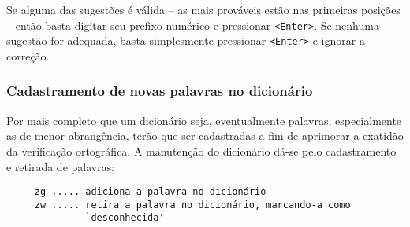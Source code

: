 Se alguma das sugestões é válida -- as mais prováveis estão nas primeiras
posições -- então basta digitar seu prefixo numérico e pressionar 
\texttt{<Enter>}. Se nenhuma sugestão for adequada, basta simplesmente
pressionar \texttt{<Enter>} e ignorar a correção.

\subsubsection{Cadastramento de novas palavras no dicionário}

Por mais completo que um dicionário seja, eventualmente palavras,
especialmente as de menor abrangência, terão que ser cadastradas a fim de
aprimorar a exatidão da verificação ortográfica. A manutenção do dicionário 
dá-se pelo cadastramento e retirada de palavras:

\begin{verbatim}
     zg ..... adiciona a palavra no dicionário
     zw ..... retira a palavra no dicionário, marcando-a como 
              `desconhecida'
\end{verbatim}
